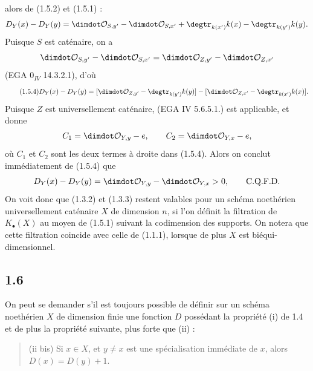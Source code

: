 alors de (1.5.2) et (1.5.1) :
\[
D_Y(x)-D_Y(y)=\dimdot\mathcal O_{S,y'}-\dimdot\mathcal O_{S,x'}+\degtr_{k(x')}k(x)-\degtr_{k(y')}k(y).
\]
Puisque $S$ est caténaire, on a
\[
\dimdot\mathcal O_{S,y'}-\dimdot\mathcal O_{S,x'}=\dimdot\mathcal O_{Z,y'}-\dimdot\mathcal O_{Z,x'}
\]
(EGA $0_{IV}$ 14.3.2.1), d'où
\begin{equation}\tag{1.5.4}
D_Y(x)-D_Y(y)=
[\dimdot\mathcal O_{Z,y'}-\degtr_{k(y')}k(y)]-[\dimdot\mathcal O_{Z,x'}-\degtr_{k(x')}k(x)].
\end{equation}
Puisque $Z$ est universellement caténaire, (EGA IV 5.6.5.1.) est applicable, et donne
\[
C_1=\dimdot\mathcal O_{Y,y}-e,\qquad C_2=\dimdot\mathcal O_{Y,x}-e,
\]
où $C_1$ et $C_2$ sont les deux termes à droite dans (1.5.4). Alors on conclut immédiatement de (1.5.4) que
\[
D_Y(x)-D_Y(y)=\dimdot\mathcal O_{Y,y}-\dimdot\mathcal O_{Y,x}>0,\qquad \text{C.Q.F.D.}
\]
On voit donc que (1.3.2) et (1.3.3) restent valables pour un schéma noethérien universellement caténaire $X$ de dimension $n$, si l'on définit la filtration de $K_\bullet(X)$ au moyen de (1.5.1) suivant la codimension des supports. On notera que cette filtration coincide avec celle de (1.1.1), lorsque de plus $X$ est biéqui-dimensionnel.

\subsection*{1.6}
On peut se demander s'il est toujours possible de définir sur un schéma noethérien $X$ de dimension finie une fonction $D$ possédant la propriété (i) de 1.4 et de plus la propriété suivante, plus forte que (ii) :
\begin{quote}
(ii bis) Si $x\in X$, et $y\ne x$ est une spécialisation immédiate de $x$, alors $D(x)=D(y)+1$.
\end{quote}
